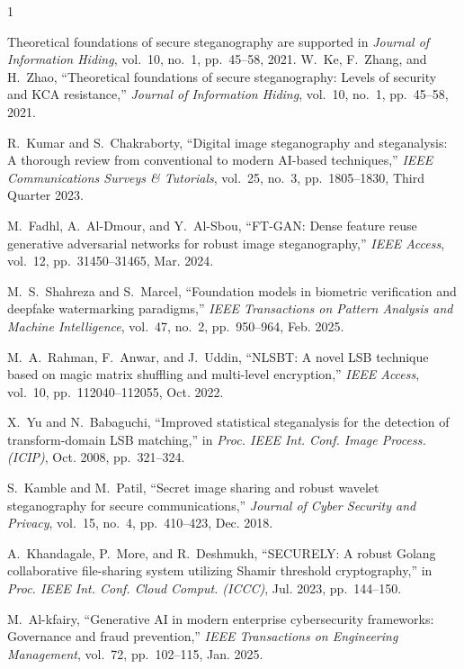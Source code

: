 \documentclass[conference]{IEEEtran}
\begin{document}
\begin{thebibliography}{1}

Theoretical foundations of secure steganography are supported in \emph{Journal of Information Hiding}, vol.~10, no.~1, pp.~45--58, 2021.
W.~Ke, F.~Zhang, and H.~Zhao, ``Theoretical foundations of secure
  steganography: Levels of security and KCA resistance,'' \emph{Journal of
  Information Hiding}, vol.~10, no.~1, pp.~45--58, 2021.

R.~Kumar and S.~Chakraborty, ``Digital image steganography and steganalysis:
  A thorough review from conventional to modern AI-based techniques,''
  \emph{IEEE Communications Surveys \& Tutorials}, vol.~25, no.~3,
  pp.~1805--1830, Third Quarter 2023.

M.~Fadhl, A.~Al-Dmour, and Y.~Al-Sbou, ``FT-GAN: Dense feature reuse
  generative adversarial networks for robust image steganography,'' \emph{IEEE
  Access}, vol.~12, pp.~31450--31465, Mar. 2024.

M.~S.~Shahreza and S.~Marcel, ``Foundation models in biometric verification
  and deepfake watermarking paradigms,'' \emph{IEEE Transactions on Pattern
  Analysis and Machine Intelligence}, vol.~47, no.~2, pp.~950--964, Feb. 2025.

M.~A.~Rahman, F.~Anwar, and J.~Uddin, ``NLSBT: A novel LSB technique based
  on magic matrix shuffling and multi-level encryption,'' \emph{IEEE Access},
  vol.~10, pp.~112040--112055, Oct. 2022.

X.~Yu and N.~Babaguchi, ``Improved statistical steganalysis for the
  detection of transform-domain LSB matching,'' in \emph{Proc. IEEE Int.
  Conf. Image Process. (ICIP)}, Oct. 2008, pp.~321--324.

S.~Kamble and M.~Patil, ``Secret image sharing and robust wavelet
  steganography for secure communications,'' \emph{Journal of Cyber Security
  and Privacy}, vol.~15, no.~4, pp.~410--423, Dec. 2018.

A.~Khandagale, P.~More, and R.~Deshmukh, ``SECURELY: A robust Golang
  collaborative file-sharing system utilizing Shamir threshold cryptography,''
  in \emph{Proc. IEEE Int. Conf. Cloud Comput. (ICCC)}, Jul. 2023,
  pp.~144--150.

M.~Al-kfairy, ``Generative AI in modern enterprise cybersecurity frameworks:
  Governance and fraud prevention,'' \emph{IEEE Transactions on Engineering
  Management}, vol.~72, pp.~102--115, Jan. 2025.


\end{thebibliography}
\end{document}
